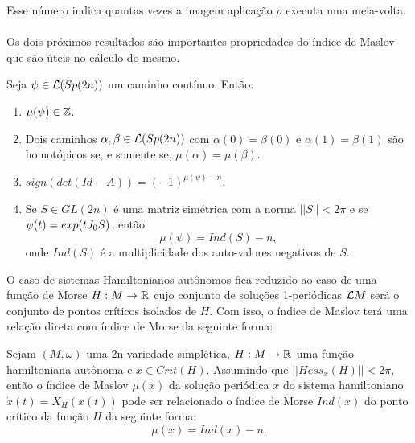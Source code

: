 \documentclass{beamer}
\begin{document}
	\begin{frame}
		Esse número indica quantas vezes a imagem aplicação $\rho$ executa uma meia-volta.
		\\~\\	
		Os dois próximos resultados são importantes propriedades do índice de Maslov que são úteis no cálculo do mesmo.
		
		\begin{teorema}
			Seja $\psi\in \mathcal{L}(Sp(2n)) $ um caminho contínuo. Então:
			\begin{enumerate}
				\item $\mu(\psi) \in \mathbb{Z}$.
				
				\item Dois caminhos $\alpha, \beta \in \mathcal{L}(Sp(2n)) $ com $\alpha(0) = \beta(0)$ e $\alpha(1) = \beta(1)$ são homotópicos se, e somente se, $\mu(\alpha) = \mu(\beta)$.
				
				\item $sign(det(Id - A)) = (-1)^{\mu(\psi)-n}$.
				
				\item Se $S \in GL(2n)$ é uma matriz simétrica com a norma $||S|| < 2\pi$ e se $\psi(t) = exp(tJ_{0} S)$, então 
				$$
				\mu(\psi) = Ind(S) - n,
				$$
				onde $Ind(S)$ é a multiplicidade dos auto-valores negativos de $S$.
			\end{enumerate}
		\end{teorema}
	\end{frame}
	
	\begin{frame}
		O caso de sistemas Hamiltonianos autônomos fica reduzido ao caso de uma função de Morse $H:M\to \mathbb{R}^{}$ cujo conjunto de soluções 1-periódicas $\mathcal{L}M$ será o conjunto de pontos críticos isolados de $H$. Com isso, o índice de Maslov terá uma relação direta com índice de Morse da seguinte forma:
		
		\begin{corolario}
			Sejam $(M, \omega)$ uma 2n-variedade simplética, $H : M \to \mathbb{R}^{}$ uma função hamiltoniana autônoma e $x \in Crit(H)$. Assumindo que $||Hess_{x}(H)|| < 2\pi$, então o índice de Maslov $\mu(x)$ da solução periódica $x$ do sistema hamiltoniano $\dot{x}(t) = X_{H}(x(t))$ pode ser relacionado o índice de Morse $Ind(x)$ do ponto crítico da função $H$ da seguinte forma:
			$$
			\mu(x) = Ind(x) - n.
			$$
		\end{corolario}
	\end{frame}
\end{document}
